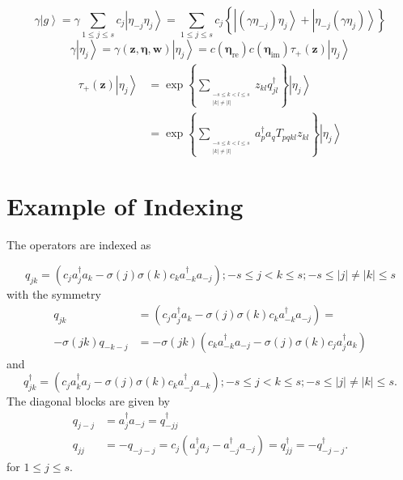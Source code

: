 \documentclass[aps,preprint]{revtex4}%
\begin{document}
\begin{equation}
\gamma\left\vert g\right\rangle =\gamma\sum_{1\leq j\leq s}c_{j}\left\vert
\eta_{-j}\eta_{j}\right\rangle =\sum_{1\leq j\leq s}c_{j}\left\{  \left\vert
\left(  \gamma\eta_{-j}\right)  \eta_{j}\right\rangle +\left\vert \eta
_{-j}\left(  \gamma\eta_{j}\right)  \right\rangle \right\}
\end{equation}%
\begin{equation}
\gamma\left\vert \eta_{j}\right\rangle =\gamma\left(  \mathbf{z,\eta
,w}\right)  \left\vert \eta_{j}\right\rangle =c\left(  \mathbf{\eta
}_{\mathrm{re}}\right)  c\left(  \mathbf{\eta}_{\mathrm{im}}\right)  \tau
_{+}\left(  \mathbf{z}\right)  \left\vert \eta_{j}\right\rangle
\end{equation}%
\begin{align}
\tau_{+}\left(  \mathbf{z}\right)  \left\vert \eta_{j}\right\rangle  &
=\exp\left\{  \sum\limits_{_{\substack{-s\leq k<l\leq s\\\left\vert
k\right\vert \neq\left\vert l\right\vert }}}z_{kl}q_{jl}^{\dagger}\right\}
\left\vert \eta_{j}\right\rangle \\
&  =\exp\left\{  \sum\limits_{_{\substack{-s\leq k<l\leq s\\\left\vert
k\right\vert \neq\left\vert l\right\vert }}}a_{p}^{\dagger}a_{q}T_{pqkl}%
z_{kl}\right\}  \left\vert \eta_{j}\right\rangle
\end{align}


\section{Example of Indexing}

The operators are indexed as%

\begin{equation}
q_{jk}=\left(  c_{j}a_{j}^{\dagger}a_{k}-\sigma\left(  j\right)  \sigma\left(
k\right)  c_{k}a_{-k}^{\dagger}a_{-j}\right)  ;-s\leq j<k\leq s;-s\leq
\left\vert j\right\vert \neq\left\vert k\right\vert \leq s
\end{equation}
with the symmetry%
\begin{align}
q_{jk}  &  =\left(  c_{j}a_{j}^{\dagger}a_{k}-\sigma\left(  j\right)
\sigma\left(  k\right)  c_{k}a_{-k}^{\dagger}a_{-j}\right)  =\\
-\sigma\left(  jk\right)  q_{-k-j}  &  =-\sigma\left(  jk\right)  \left(
c_{k}a_{-k}^{\dagger}a_{-j}-\sigma\left(  j\right)  \sigma\left(  k\right)
c_{j}a_{j}^{\dagger}a_{k}\right)
\end{align}
and
\begin{equation}
q_{jk}^{\dagger}=\left(  c_{j}a_{k}^{\dagger}a_{j}-\sigma\left(  j\right)
\sigma\left(  k\right)  c_{k}a_{-j}^{\dagger}a_{-k}\right)  ;-s\leq j<k\leq
s;-s\leq\left\vert j\right\vert \neq\left\vert k\right\vert \leq s.
\end{equation}
The diagonal blocks are given by
\begin{align}
q_{j-j}  &  =a_{j}^{\dagger}a_{-j}=q_{-jj}^{\dagger}\\
q_{jj}  &  =-q_{-j-j}=c_{j}\left(  a_{j}^{\dagger}a_{j}-a_{-j}^{\dagger}%
a_{-j}\right)  =q_{jj}^{\dagger}=-q_{-j-j}^{\dagger}.
\end{align}
for $1\leq j\leq s.$
\end{document}
